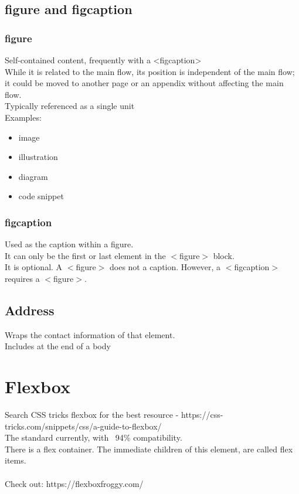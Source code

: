 \documentclass[]{article}
\newcommand{\<}{\guilsinglleft}
\renewcommand{\>}{\guilsinglright}
\begin{document}
\subsection{figure and figcaption}
\subsubsection{figure}
Self-contained content, frequently with a <figcaption>
\\
While it is related to the main flow, its position is independent of the main flow; it could be moved to another page or an appendix without affecting the main flow. 
\\
Typically referenced as a single unit
\\
Examples:
\begin{itemize}
	\item image
	\item illustration
	\item diagram
	\item code snippet
\end{itemize}
\subsubsection{figcaption}
Used as the caption within a figure.
\\
It can only be the first or last element in the $<$figure$>$ block.
\\
It is optional.  A $<$figure$>$ does not a caption.  However, a $<$figcaption$>$ requires a $<$figure$>$.

\subsection{Address}
Wraps the contact information of that element.
\\
Includes at the end of a body 

\section{Flexbox}
Search CSS tricks flexbox for the best resource - https://css-tricks.com/snippets/css/a-guide-to-flexbox/
\\
The standard currently, with ~94\% compatibility.
\\
There is a flex container.  The immediate children of this element, are called flex items.
\\\\
Check out: https://flexboxfroggy.com/
\end{document}
